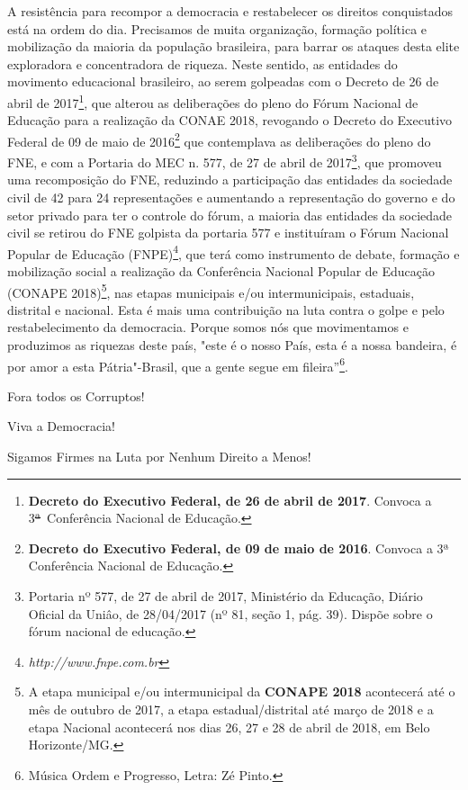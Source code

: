 A resistência para recompor a democracia e restabelecer os direitos
conquistados está na ordem do dia. Precisamos de muita organização,
formação política e mobilização da maioria da população brasileira, para
barrar os ataques desta elite exploradora e concentradora de riqueza.
Neste sentido, as entidades do movimento educacional brasileiro, ao
serem golpeadas com o Decreto de 26 de abril de 2017\footnote{\textbf{Decreto
  do Executivo Federal, de 26 de abril de 2017}. Convoca a
  3\sout{ª}~Conferência Nacional de Educação.}, que alterou as
deliberações do pleno do Fórum Nacional de Educação para a realização da
CONAE 2018, revogando o Decreto do Executivo Federal de 09 de maio de
2016\footnote{\textbf{Decreto do Executivo Federal, de 09 de maio de
  2016}. Convoca a 3ª Conferência Nacional de Educação.} que contemplava
as deliberações do pleno do FNE, e com a Portaria do MEC n. 577, de 27
de abril de 2017\footnote{Portaria nº 577, de 27 de abril de
  2017, Ministério da Educação, Diário Oficial da Uniâo, de 28/04/2017
  (nº 81, seção 1, pág. 39). Dispõe sobre o fórum nacional de
  educação.},
que promoveu uma recomposição do FNE, reduzindo a participação das
entidades da sociedade civil de 42 para 24 representações e aumentando a
representação do governo e do setor privado para ter o controle do
fórum, a maioria das entidades da sociedade civil se retirou do FNE
golpista da portaria 577 e instituíram o Fórum Nacional Popular de
Educação (FNPE)\footnote{\emph{http://www.fnpe.com.br}},
que terá como instrumento de debate, formação e mobilização social a
realização da Conferência Nacional Popular de Educação (CONAPE
2018)\footnote{A etapa municipal e/ou intermunicipal da \textbf{CONAPE
  2018} acontecerá até o mês de outubro de 2017, a etapa
  estadual/distrital até março de 2018 e a etapa Nacional acontecerá nos
  dias 26, 27 e 28 de abril de 2018, em Belo Horizonte/MG.}, nas etapas
municipais e/ou intermunicipais, estaduais, distrital e nacional. Esta é
mais uma contribuição na luta contra o golpe e pelo restabelecimento da
democracia. Porque somos nós que movimentamos e produzimos as riquezas
deste país, "este é o nosso País, esta é a nossa bandeira, é por amor a
esta Pátria"-Brasil, que a gente segue em fileira''\footnote{Música Ordem
  e Progresso, Letra: Zé Pinto.}.

Fora todos os Corruptos!

Viva a Democracia!

Sigamos Firmes na Luta por Nenhum Direito a Menos!
